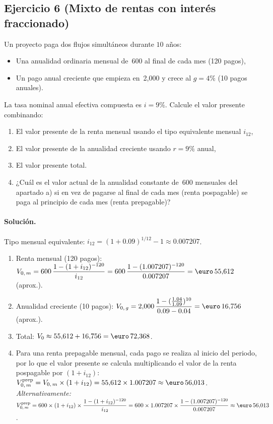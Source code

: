 \documentclass[12pt,a4paper]{article}
\newenvironment{ejercicio}[1]{\subsection*{Ejercicio #1}}{}
\newenvironment{solucion}{\paragraph{Solución.}}{}
\begin{document}
\begin{ejercicio}{6 (Mixto de rentas con interés fraccionado)}
Un proyecto paga dos flujos simultáneos durante $10$ años:
\begin{itemize}
  \item Una anualidad ordinaria mensual de \text{\euro}\,600 al final de cada mes (120 pagos),
  \item Un pago anual creciente que empieza en \text{\euro}\,2{,}000 y crece al $g=4\%$ (10 pagos anuales).
\end{itemize}
La tasa nominal anual efectiva compuesta es $i=9\%$. Calcule el valor presente combinando:
\begin{enumerate}[label=\alph*)]
  \item El valor presente de la renta mensual usando el tipo equivalente mensual $i_{12}$,
  \item El valor presente de la anualidad creciente usando $r=9\%$ anual,
  \item El valor presente total.
  \item ¿Cuál es el valor actual de la anualidad constante de \text{\euro}\,600 mensuales del apartado a) si en vez de pagarse al final de cada mes (renta pospagable) se paga al principio de cada mes (renta prepagable)?
\end{enumerate}
\end{ejercicio}
\begin{solucion}
Tipo mensual equivalente: $i_{12}=(1+0.09)^{1/12}-1\approx0.007207$.\\
\begin{enumerate}[label=\alph*)]
  \item Renta mensual (120 pagos): $V_{0,\,m}=600\,\dfrac{1-(1+i_{12})^{-120}}{i_{12}}=600\,\dfrac{1-(1.007207)^{-120}}{0.007207}=\text{\euro}\,55{,}612$ (aprox.).
  \item Anualidad creciente (10 pagos): $V_{0,\,g}=2{,}000\,\dfrac{1-(\tfrac{1.04}{1.09})^{10}}{0.09-0.04}=\text{\euro}\,16{,}756$ (aprox.).
  \item Total: $V_0\approx55{,}612+16{,}756=\text{\euro}\,72{,}368$.
  \item Para una renta prepagable mensual, cada pago se realiza al inicio del periodo, por lo que el valor presente se calcula multiplicando el valor de la renta pospagable por $(1+i_{12})$:\\
        $V_{0,\,m}^{\text{prep}}=V_{0,\,m}\times(1+i_{12})=55{,}612\times1.007207\approx\text{\euro}\,56{,}013$.\\
        \textit{Alternativamente:} $V_{0,\,m}^{\text{prep}}=600\times(1+i_{12})\times\dfrac{1-(1+i_{12})^{-120}}{i_{12}}=600\times1.007207\times\dfrac{1-(1.007207)^{-120}}{0.007207}\approx\text{\euro}\,56{,}013$.
\end{enumerate}
\end{solucion}
\end{document}
